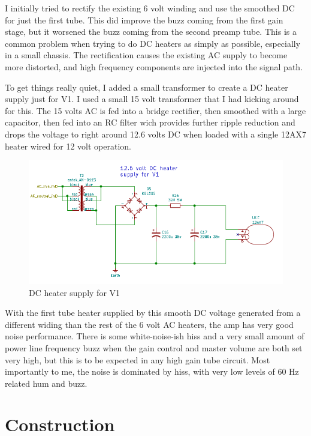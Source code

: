 \documentclass[pdftex,letterpaper,11pt]{article}
\begin{document}
I initially tried to rectify the existing 6 volt winding and use the smoothed DC for just the first tube. This did improve the buzz coming from the first gain stage, but it worsened the buzz coming from the second preamp tube. This is a common problem when trying to do DC heaters as simply as possible, especially in a small chassis. The rectification causes the existing AC supply to become more distorted, and high frequency components are injected into the signal path.

To get things really quiet, I added a small transformer to create a DC heater supply just for V1. I used a small 15 volt transformer that I had kicking around for this. The 15 volts AC is fed into a bridge rectifier, then smoothed with a large capacitor, then fed into an RC filter wich provides further ripple reduction and drops the voltage to right around 12.6 volts DC when loaded with a single 12AX7 heater wired for 12 volt operation.

\begin{figure}[H]
\centering
\caption{DC heater supply for V1}
\includegraphics[width=\textwidth]{power_supply_2.png}
\end{figure}

With the first tube heater supplied by this smooth DC voltage generated from a different widing than the rest of the 6 volt AC heaters, the amp has very good noise performance. There is some white-noise-ish hiss and a very small amount of power line frequency buzz when the gain control and master volume are both set very high, but this is to be expected in any high gain tube circuit. Most importantly to me, the noise is dominated by hiss, with very low levels of 60 Hz related hum and buzz.

\section{Construction}
\end{document}
